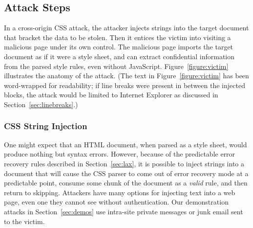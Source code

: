 \documentclass{sig-alternate}
\begin{document}
\subsection{Attack Steps}

In a cross-origin CSS attack, the attacker injects strings into the
target document that bracket the data to be stolen.  Then it entices
the victim into visiting a malicious page under its own control.  The
malicious page imports the target document as if it were a style
sheet, and can extract confidential information from the parsed style
rules, even without JavaScript.  Figure~\ref{figure:victim}
illustrates the anatomy of the attack. (The text in
Figure~\ref{figure:victim} has been word-wrapped for readability; if
line breaks were present in between the injected blocks, the attack
would be limited to Internet Explorer as discussed in Section~\ref{sec:linebreaks}.)

\subsubsection{CSS String Injection}
One might expect that an HTML document, when parsed as a style sheet,
would produce nothing but syntax errors.  However, because of the
predictable error recovery rules described in Section~\ref{sec:lax},
it is possible to inject strings into a document that will cause the
CSS parser to come out of error recovery mode at a predictable point,
consume some chunk of the document as a \emph{valid} rule, and then
return to skipping.  Attackers have many options for injecting text
into a web page, even one they cannot see without authentication.
Our demonstration attacks in Section~\ref{sec:demos} use
intra-site private messages or junk email sent to the victim.
\end{document}

